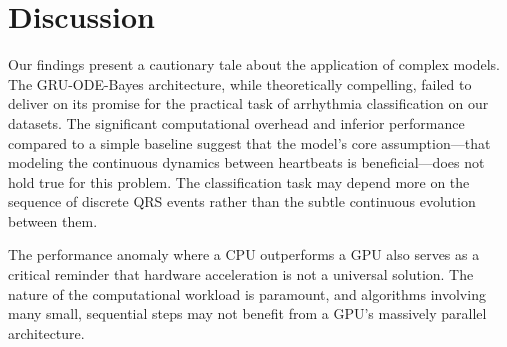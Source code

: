 \section{Discussion}
\label{sec:discussion}

Our findings present a cautionary tale about the application of complex models. 
The GRU-ODE-Bayes architecture, while theoretically compelling, failed to deliver on its promise for the practical 
task of arrhythmia classification on our datasets. 
The significant computational overhead and inferior performance compared to a simple baseline suggest that the 
model's core assumption—that modeling the continuous dynamics between heartbeats is beneficial—does not hold 
true for this problem. 
The classification task may depend more on the sequence of discrete QRS events rather 
than the subtle continuous evolution between them.

The performance anomaly where a CPU outperforms a GPU also serves as a critical reminder that hardware acceleration 
is not a universal solution. 
The nature of the computational workload is paramount, and algorithms involving many small, 
sequential steps may not benefit from a GPU's massively parallel architecture.